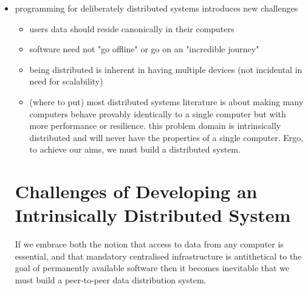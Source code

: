 \documentclass[sigplan,10pt]{acmart}
\begin{document}
\begin{itemize}
    \item programming for deliberately distributed systems introduces new challenges
    \begin{itemize}
        \item users data should reside canonically in their computers
        \item software need not "go offline" or go on an "incredible journey"
        \item being distributed is inherent in having multiple devices (not incidental in need for scalability)
        \item (where to put) most distributed systems literature is about making many computers behave provably identically to a single computer but with more performance or resilience. this problem domain is intrinsically distributed and will never have the properties of a single computer.
    Ergo, to achieve our aims, we must build a distributed system.
    \end{itemize}

\section{Challenges of Developing an Intrinsically Distributed System}

If we embrace both the notion that access to data from any computer is essential, and that mandatory centralised infrastructure is antithetical to the goal of permanently available software then it becomes inevitable that we must build a peer-to-peer data distribution system. 


\end{itemize}
\end{document}
